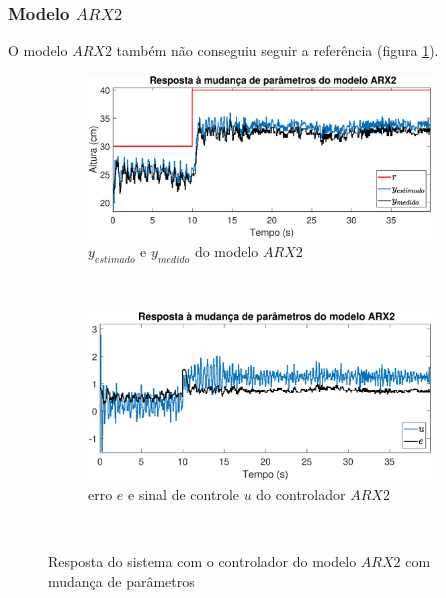 \subsubsection{Modelo $ARX2$}
O modelo $ARX2$ também não conseguiu seguir a referência (figura \ref{fig:mprarx2y}).
\begin{figure}[htb]
	\centering
	\begin{subfigure}[t]{0.48\textwidth}
		\includegraphics[width=1\linewidth]{mprarx2y}
		\caption[$y_{estimado}$ e $y_{medido}$ do modelo $ARX2$]{$y_{estimado}$ e $y_{medido}$ do modelo $ARX2$}
		\label{fig:mprarx2y}
	\end{subfigure}
	~ %
	\begin{subfigure}[t]{0.48\textwidth}
		\includegraphics[width=1\linewidth]{mprarx2e}
		\caption[erro $e$ e sinal de controle $u$ do controlador $ARX2$]{erro $e$ e sinal de controle $u$ do controlador $ARX2$}
		\label{fig:mprarx2e}
	\end{subfigure}
	~ %
	
	\caption{Resposta do sistema com o controlador do modelo $ARX2$ com mudança de parâmetros}\label{fig:mprarx2}
\end{figure}

